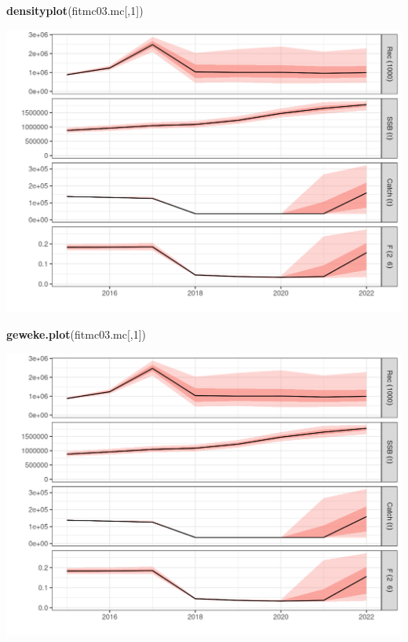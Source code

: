 \documentclass[
]{book}
\newenvironment{Shaded}{\begin{snugshade}}{\end{snugshade}}
\newcommand{\DecValTok}[1]{\textcolor[rgb]{0.00,0.00,0.81}{#1}}
\newcommand{\FunctionTok}[1]{\textcolor[rgb]{0.13,0.29,0.53}{\textbf{#1}}}
\newcommand{\NormalTok}[1]{#1}
\begin{document}
\begin{Shaded}
\begin{Highlighting}[]
\FunctionTok{densityplot}\NormalTok{(fitmc03.mc[,}\DecValTok{1}\NormalTok{])}
\end{Highlighting}
\end{Shaded}

\includegraphics{_bookdown_files/_main_files/figure-html/unnamed-chunk-129-1.png}

\begin{Shaded}
\begin{Highlighting}[]
\FunctionTok{geweke.plot}\NormalTok{(fitmc03.mc[,}\DecValTok{1}\NormalTok{])}
\end{Highlighting}
\end{Shaded}

\includegraphics{_bookdown_files/_main_files/figure-html/unnamed-chunk-130-1.png}
\end{document}
